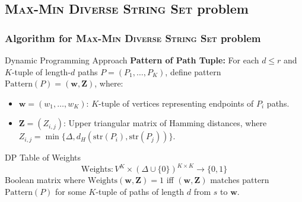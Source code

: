 \documentclass{beamer}
\begin{document}
\subsection{\textsc{Max-Min Diverse String Set} problem}
\begin{frame}
    \frametitle{Algorithm for \textsc{Max-Min Diverse String Set} problem}
    \begin{block}{Dynamic Programming Approach}
            \textbf{Pattern of Path Tuple:} For each \( d \leq r \) and \( K \)-tuple of length-\( d \) paths \( P = (P_1, \dots, P_K) \),
            define pattern \( \text{Pattern}(P) = (\mathbf{w}, \mathbf{Z}) \), where:
            \begin{itemize}
                \item \( \mathbf{w} = (w_1, \ldots, w_K) \): \( K \)-tuple of vertices representing endpoints of \( P_i \) paths.
                \item \( \mathbf{Z} = (Z_{i,j}) \): Upper triangular matrix of Hamming distances, where \( Z_{i,j} = \min \{\Delta, d_H(\text{str}(P_i), \text{str}(P_j))\} \).
        \end{itemize}
    \end{block}
    \begin{block}{DP Table of Weights}
        \begin{equation}
            \text{Weights}: V^K \times (\Delta \cup \{0\})^{K \times K} \to \{0, 1\}
        \end{equation}
        Boolean matrix where \( \text{Weights}(\mathbf{w}, \mathbf{Z}) = 1 \) iff \( (\mathbf{w}, \mathbf{Z}) \) matches pattern \( \text{Pattern}(P) \) for some \( K \)-tuple of paths of length \( d \) from $s$ to $\mathbf{w}$.
    \end{block}
\end{frame}
\end{document}
